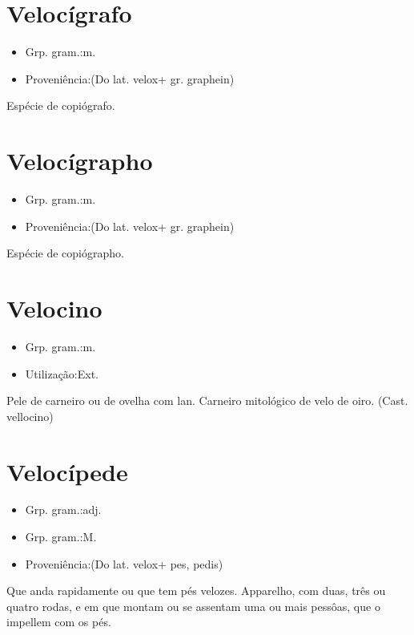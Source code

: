 \documentclass{article}
\begin{document}
\section{Velocígrafo}
\begin{itemize}
\item {Grp. gram.:m.}
\end{itemize}
\begin{itemize}
\item {Proveniência:(Do lat. \textunderscore velox\textunderscore  + gr. \textunderscore graphein\textunderscore )}
\end{itemize}
Espécie de copiógrafo.
\section{Velocígrapho}
\begin{itemize}
\item {Grp. gram.:m.}
\end{itemize}
\begin{itemize}
\item {Proveniência:(Do lat. \textunderscore velox\textunderscore  + gr. \textunderscore graphein\textunderscore )}
\end{itemize}
Espécie de copiógrapho.
\section{Velocino}
\begin{itemize}
\item {Grp. gram.:m.}
\end{itemize}
\begin{itemize}
\item {Utilização:Ext.}
\end{itemize}
Pele de carneiro ou de ovelha com lan.
Carneiro mitológico de velo de oiro.
(Cast. \textunderscore vellocino\textunderscore )
\section{Velocípede}
\begin{itemize}
\item {Grp. gram.:adj.}
\end{itemize}
\begin{itemize}
\item {Grp. gram.:M.}
\end{itemize}
\begin{itemize}
\item {Proveniência:(Do lat. \textunderscore velox\textunderscore  + \textunderscore pes\textunderscore , \textunderscore pedis\textunderscore )}
\end{itemize}
Que anda rapidamente ou que tem pés velozes.
Apparelho, com duas, três ou quatro rodas, e em que montam ou se assentam uma ou mais pessôas, que o impellem com os pés.
\end{document}
